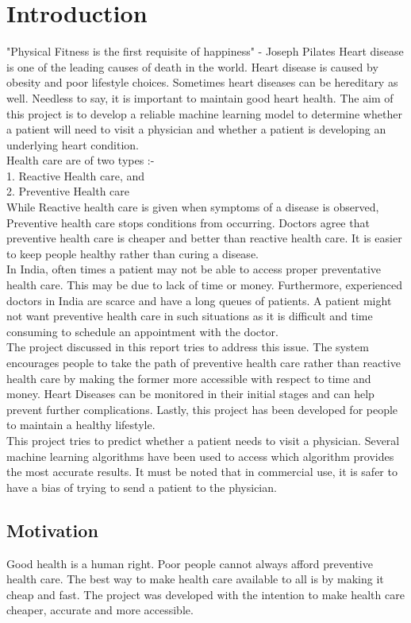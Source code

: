 

\chapter{Introduction}
"Physical Fitness is the first requisite of happiness" - Joseph Pilates
Heart disease is one of the leading causes of death in the world. Heart disease is caused by obesity and poor lifestyle choices. Sometimes heart diseases can be hereditary as well. Needless to say, it is important to maintain good heart health. The aim of this project is to develop a reliable machine learning model to determine whether a patient will need to visit a physician and whether a patient is developing an underlying heart condition. 
\\
Health care are of two types :-
\\1. Reactive Health care, and
\\2. Preventive Health care
\\While Reactive health care is given when symptoms of a disease is observed, Preventive health care stops conditions from occurring. Doctors agree that preventive health care is cheaper and better than reactive health care. It is easier to keep people healthy rather than curing a disease.
\\ 
In India, often times a patient may not be able to access proper preventative health care. This may be due to lack of  time or money. Furthermore, experienced doctors in India are scarce and have a long queues of patients. A patient might not want preventive health care in such situations as it is difficult and time consuming to schedule an appointment with the doctor.  
\\
The project discussed in this report tries to address this issue. The system encourages people to take the path of preventive health care rather than reactive health care by making the former more accessible with respect to time and money. Heart Diseases can be monitored in their initial stages and can help prevent further complications. Lastly, this project has been developed for people to maintain a healthy lifestyle.
\\
This project tries to predict whether a patient needs to visit a physician. Several machine learning algorithms have been used to access which algorithm provides the most accurate results. It must be noted that in commercial use, it is safer to have a bias of trying to send a patient to the physician.


\section{Motivation}
Good health is a human right. Poor people cannot always afford preventive health care. The best way to make health care available to all is by making it cheap and fast. The project was developed with the intention to make health care cheaper, accurate and more accessible.

